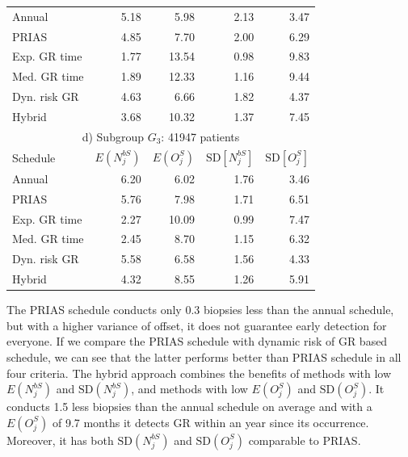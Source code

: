 \begin{table}
\begin{tabular}{lrrrr}
\hline
Annual         & 5.18            & 5.98                & 2.13          & 3.47              \\
PRIAS          & 4.85            & 7.70                & 2.00          & 6.29        \\
Exp. GR time & 1.77            & 13.54               & 0.98          & 9.83              \\
Med. GR time & 1.89             & 12.33               & 1.16          & 9.44              \\
Dyn. risk GR       & 4.63            & 6.66                & 1.82          & 4.37              \\
Hybrid       & 3.68            & 10.32                & 1.37          & 7.45              \\
\hline      
\multicolumn{5}{c}{d) Subgroup $G_3$: 41947 patients}\\
\hline
Schedule        & $E(N^{bS}_j)$ & $E(O^S_j)$ & ${\mbox{SD}[N^{bS}_j]}$ & ${\mbox{SD}[O^S_j]}$ \\
\hline
Annual         & 6.20             & 6.02                & 1.76          & 3.46              \\
PRIAS          & 5.76             & 7.98                & 1.71         & 6.51        \\
Exp. GR time & 2.27            & 10.09               & 0.99          & 7.47              \\
Med. GR time & 2.45            & 8.70                & 1.15          & 6.32              \\
Dyn. risk GR       & 5.58            & 6.58                & 1.56          & 4.33              \\
Hybrid       & 4.32            & 8.55                & 1.26          & 5.91              \\
\hline     
\end{tabular}
\end{table}

The PRIAS schedule conducts only 0.3 biopsies less than the annual schedule, but with a higher variance of offset, it does not guarantee early detection for everyone. If we compare the PRIAS schedule with dynamic risk of GR based schedule, we can see that the latter performs better than PRIAS schedule in all four criteria. The hybrid approach combines the benefits of methods with low $E(N^{bS}_j)$ and $\mbox{SD}(N^{bS}_j)$, and methods with low $E(O^S_j)$ and $\mbox{SD}(O^S_j)$. It conducts 1.5 less biopsies than the annual schedule on average and with a $E(O^S_j)$ of 9.7 months it detects GR within an year since its occurrence. Moreover, it has both $\mbox{SD}(N^{bS}_j)$ and $\mbox{SD}(O^S_j)$ comparable to PRIAS.

